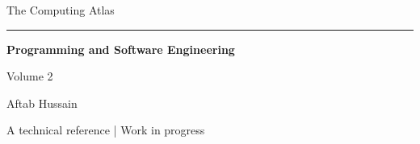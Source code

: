 \documentclass[11pt,oneside,openany]{book}
\begin{document}
\frontmatter
\begin{titlepage}
\centering
\vspace*{3.7cm}
{\Large The Computing Atlas\par}
\vspace{0.65cm}
\rule{0.6\textwidth}{0.5pt}\par
\vspace{0.75cm}
{\Huge\bfseries Programming and Software Engineering\par}
\vspace{1.0cm}
{\large Volume 2\par}
\vfill
{\large Aftab Hussain\par}
\vspace{0.6cm}
{\small A technical reference | Work in progress\par}
\vspace{1.2cm}
\end{titlepage}
\tableofcontents
\mainmatter



\end{document}
